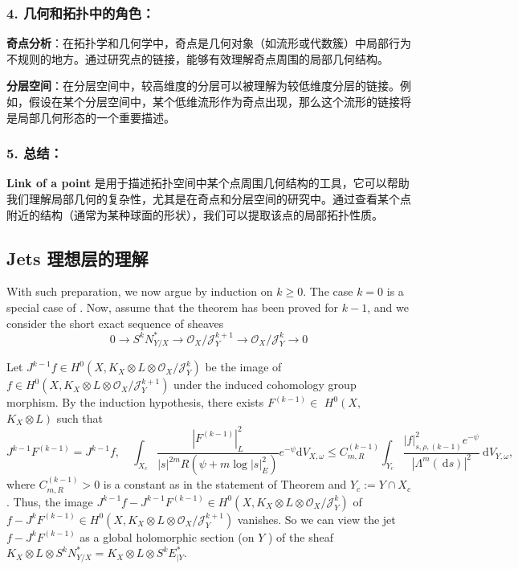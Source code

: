 \documentclass[lang=cn,zihao=5,twoside,fontset=none]{textbook}
\begin{document}
\subsubsection{4. \textbf{几何和拓扑中的角色}：}
\textbf{奇点分析}：在拓扑学和几何学中，奇点是几何对象（如流形或代数簇）中局部行为不规则的地方。通过研究点的链接，能够有效理解奇点周围的局部几何结构。

\textbf{分层空间}：在分层空间中，较高维度的分层可以被理解为较低维度分层的链接。例如，假设在某个分层空间中，某个低维流形作为奇点出现，那么这个流形的链接将是局部几何形态的一个重要描述。

\subsubsection{5. \textbf{总结}：}
\textbf{Link of a point} 是用于描述拓扑空间中某个点周围几何结构的工具，它可以帮助我们理解局部几何的复杂性，尤其是在奇点和分层空间的研究中。通过查看某个点附近的结构（通常为某种球面的形状），我们可以提取该点的局部拓扑性质\cite{lelong1957integration}。

\subsection{Jets 理想层的理解}

With such preparation, we now argue by induction on $k \geq 0$. The case $k=0$ is a special case of \cite[Theorem 1.1]{ZZ18}. Now, assume that the theorem has been proved for $k-1$, and we consider the short exact sequence of sheaves
$$
0 \longrightarrow S^k N_{Y / X}^* \longrightarrow \mathcal{O}_X / \mathcal{J}_Y^{k+1} \longrightarrow \mathcal{O}_X / \mathcal{J}_Y^k \longrightarrow 0
$$

Let $J^{k-1} f \in H^0\left(X, K_X \otimes L \otimes \mathcal{O}_X / \mathcal{J}_Y^k\right)$ be the image of $f \in H^0\left(X, K_X \otimes L \otimes \mathcal{O}_X / \mathcal{J}_Y^{k+1}\right)$ under the induced cohomology group morphism. By the induction hypothesis, there exists $F^{(k-1)} \in$ $H^0\left(X, \right.$ $\left. K_X \otimes L\right)$ such that
\[
  J^{k-1} F^{(k-1)}=J^{k-1} f, \quad \int_{X_c} \frac{\left|F^{(k-1)}\right|_L^2}{|s|^{2 m} R\left(\psi+m \log |s|_E^2\right)} e^{-\psi}\mathrm{d} V_{X, \omega} \leq C_{m, R}^{(k-1)} \int_{Y_c} \frac{|f|_{s, \rho,(k-1)}^2 e^{-\psi}}{\left|\Lambda^m(\mathrm{~d} s)\right|^2} \mathrm{~d} V_{Y, \omega},
\]
where $C_{m, R}^{(k-1)}>0$ is a constant as in the statement of Theorem  and $Y_c:=Y \cap X_c$. Thus, the image $J^{k-1} f-J^{k-1} F^{(k-1)} \in H^0\left(X, K_X \otimes L \otimes \mathcal{O}_X / \mathcal{J}_Y^k\right)$ of $f-J^k F^{(k-1)} \in H^0\left(X, K_X \otimes L \otimes \mathcal{O}_X / \mathcal{J}_Y^{k+1}\right)$ vanishes. So we can view the jet $f-J^k F^{(k-1)}$ as a global holomorphic section (on $Y$ ) of the sheaf $K_X \otimes L \otimes S^k N_{Y / X}^*=K_X \otimes L \otimes S^k E_{\mid Y}^*$.
\end{document}
